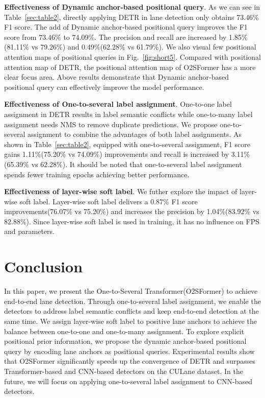 \documentclass{bmvc2k}
\begin{document}
  {\bf Effectiveness of Dynamic anchor-based positional query}. As we can see in Table~\ref{sec:table2}, 
  directly applying DETR in lane detection only obtains 73.46\% F1 score. The add of 
  Dynamic anchor-based positional query improves the F1 score from 73.46\% to 74.09\%. 
  The precision and recall are increased by 1.85\%(81.11\% vs 79.26\%) and 0.49\%(62.28\% vs 61.79\%). We also visual few 
  positional attention maps of positional queries in Fig.~\ref{fig:short5}. Compared with 
  positional attention map of DETR, the positional attention map of O2SFormer has a more clear focus area. 
  Above results demonstrate that Dynamic anchor-based positional query can effectively improve the model performance.
  
  {\bf Effectiveness of One-to-several label assignment}. One-to-one label assignment in DETR results in label semantic 
   conflicts while one-to-many label assignment needs NMS to remove duplicate predictions. We propose 
   one-to-several assignment to combine the advantages of both label assignments. As shown in Table~\ref{sec:table2}, 
   equipped with one-to-several assignment, F1 score gains 1.11\%(75.20\% vs 74.09\%) improvements 
   and recall is increased by 3.11\%(65.39\% vs 62.28\%). 
   It should be noted that one-to-several label assignment spends fewer training epochs achieving better performance.
  
  {\bf Effectiveness of layer-wise soft label}. We futher explore the impact of layer-wise soft label. 
  Layer-wise soft label delivers a 0.87\% F1 score improvements(76.07\% vs 75.20\%) and increases 
  the precision by 1.04\%(83.92\% vs 82.88\%). Since layer-wise soft label is used in training, it has no influence on FPS and parameters.
  
 
 \section{Conclusion}
 In this paper, we present the One-to-Several Transformer(O2SFormer) to achieve end-to-end lane detection. 
 Through one-to-several label assignment, we enable the detectors to address label semantic conflicts and keep end-to-end detection at the same time.
 We assign layer-wise soft label to positive lane anchors to achieve the balance between one-to-one and one-to-many assignment. 
 To explore explicit positional prior information, we propose the dynamic anchor-based positional query by encoding lane anchors as positional queries.
 Experimental results show that O2SFormer significantly speeds up the convergence of DETR and surpasses Transformer-based and CNN-based
 detectors on the CULane dataset. In the future, we will focus on applying one-to-several label assignment to CNN-based detectors.
\clearpage

\clearpage
\appendix
\end{document}
